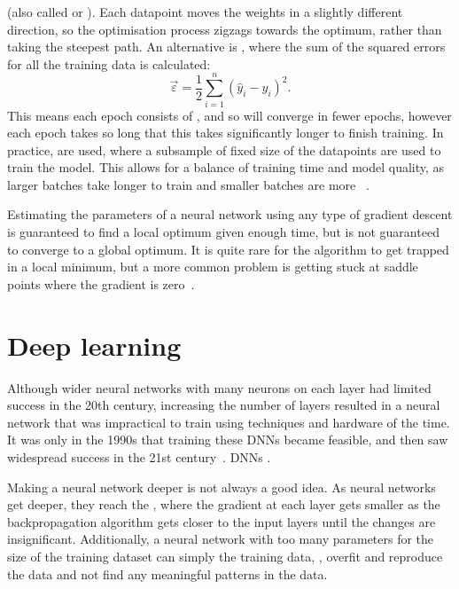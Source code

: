   (also called  or ).
Each datapoint moves the weights in a slightly different direction, so the optimisation process zigzags towards the optimum, rather than taking the steepest path.
An alternative is , where the sum of the squared errors for all the training data is calculated:
\[ \vec{\varepsilon} = \frac{1}{2} \sum_{i = 1}^{n}\left(\hat{y}_i - y_i\right)^2. \]
This means each epoch consists of , and so will converge in fewer epochs, however each epoch takes so long that this takes significantly longer to finish training.
In practice,  are used, where a subsample of fixed size of the datapoints are used to train the model.
This allows for a balance of training time and model quality, as larger batches take longer to train and smaller batches are more ~\autocite[59]{thoma2017}.

Estimating the parameters of a neural network using any type of gradient descent is guaranteed to find a local optimum given enough time, but is not guaranteed to converge to a global optimum.
It is quite rare for the algorithm to get trapped in a local minimum, but a more common problem is getting stuck at saddle points where the gradient is zero~\autocite[438]{lecun2015}.

\section{Deep learning} \label{sec:deep-learning}

Although wider neural networks with many neurons on each layer had limited success in the 20th century, increasing the number of layers resulted in a neural network that was impractical to train using techniques and hardware of the time.
It was only in the 1990s that training these \acp{DNN} became feasible, and then saw widespread success in the 21st century~\autocite[86]{schmidhuber2015}.
\acp{DNN} .

Making a neural network deeper is not always a good idea.
As neural networks get deeper, they reach the , where the gradient at each layer gets smaller as the backpropagation algorithm gets closer to the input layers until the changes are insignificant.
Additionally, a neural network with too many parameters for the size of the training dataset can simply  the training data, \ie{}, overfit and reproduce the data and not find any meaningful patterns in the data.

